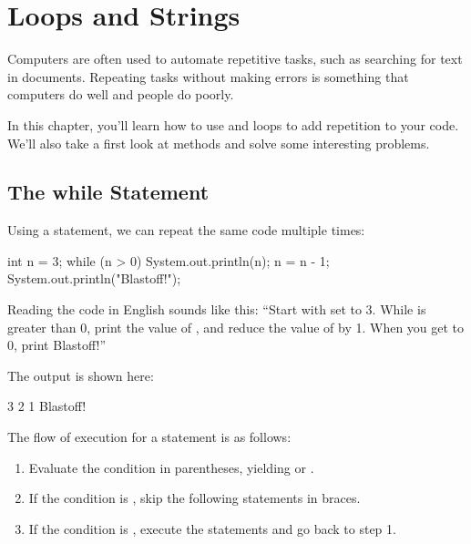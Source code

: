 \chapter{Loops and Strings}
\label{loops-strings}

Computers are often used to automate repetitive tasks, such as searching for text in documents.
Repeating tasks without making errors is something that computers do well and people do poorly.

In this chapter, you'll learn how to use  and  loops to add repetition to your code.
We'll also take a first look at  methods and solve some interesting problems.



\section{The while Statement}
\label{loops-strings_while-statement}


Using a  statement, we can repeat the same code multiple times:

\begin{code}
int n = 3;
while (n > 0) {
    System.out.println(n);
    n = n - 1;
}
System.out.println("Blastoff!");
\end{code}

Reading the code in English sounds like this: ``Start with  set to 3.
While  is greater than 0, print the value of , and reduce the value of  by 1.
When you get to 0, print Blastoff!''

The output is shown here:

\begin{stdout}
3
2
1
Blastoff!
\end{stdout}

The flow of execution for a  statement is as follows:

\begin{enumerate}

\item Evaluate the condition in parentheses, yielding  or .

\item If the condition is , skip the following statements in braces.

\item If the condition is , execute the statements and go back to step 1.

\end{enumerate}

